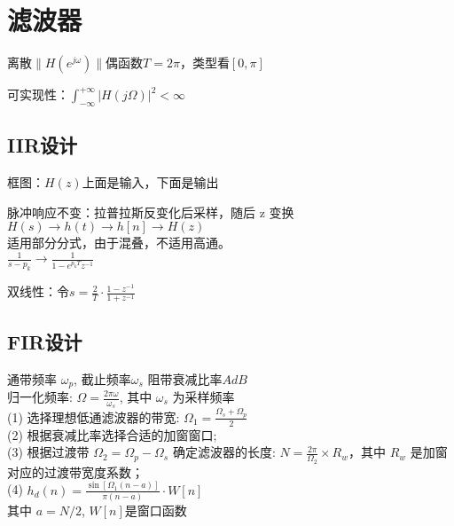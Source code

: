\section{滤波器}
离散\(\|H(e^{j\omega})\|\)偶函数\(T=2\pi\)，类型看\([0,\pi]\)

可实现性：\(\int_{-\infty}^{+\infty}|H(j\Omega)|^2<\infty\)

\subsection{IIR设计}
框图：\(H(z)\)上面是输入，下面是输出

脉冲响应不变：拉普拉斯反变化后采样，随后 z 变换
$H(s)\to h(t)\to h[n]\to H(z)$\\
适用部分分式，由于混叠，不适用高通。\\
\(\frac{1}{s-p_k}\to \frac{1}{1-e^{p_kT}z^{-1}}\)

双线性：令\(s=\frac{2}{T}\cdot \frac{1-z^{-1}}{1+z^{-1}}\)

\subsection{FIR设计}
通带频率 $\omega_{p}$, 截止频率$\omega_{s}$ 阻带衰减比率$A dB$\\
归一化频率: $\Omega=\frac{2 \pi \omega}{\omega_{s}}$, 其中 $\omega_{s}$ 为采样频率\\
(1) 选择理想低通滤波器的带宽: $\Omega_{1}=\frac{\Omega_{s}+\Omega_{p}}{2}$\\
(2) 根据衰减比率选择合适的加窗窗口;\\
(3) 根据过渡带 $\Omega_{2}=\Omega_{p}-\Omega_{s}$ 确定滤波器的长度: $N=\frac{2 \pi}{\Omega_{2}} \times R_{w}$，其中 $R_{w}$ 是加窗对应的过渡带宽度系数；\\
(4) $ h_{d}(n)=\frac{\sin \left[\Omega_{1}(n-a)\right]}{\pi(n-a)} \cdot W[n] $\\
其中
$a=N/2$,
$W[n]$是窗口函数